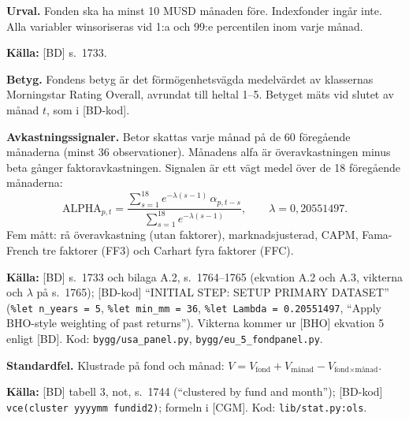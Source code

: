 \documentclass[10pt,a4paper]{article}
\newcommand{\kalla}[1]{\par\noindent\textbf{Källa:} #1\par}
\newcommand{\kod}[1]{\texttt{#1}}
\begin{document}
\textbf{Urval.} Fonden ska ha minst 10 MUSD månaden före. Indexfonder ingår inte. Alla variabler winsoriseras vid 1:a och 99:e percentilen inom varje månad.
\kalla{[BD] s.~1733.}

\textbf{Betyg.} Fondens betyg är det förmögenhetsvägda medelvärdet av klassernas Morningstar Rating Overall, avrundat till heltal 1--5. Betyget mäts vid slutet av månad $t$, som i [BD-kod].

\textbf{Avkastningssignaler.} Betor skattas varje månad på de 60 föregående månaderna (minst 36 observationer). Månadens alfa är överavkastningen minus beta gånger faktoravkastningen. Signalen är ett vägt medel över de 18 föregående månaderna:
\begin{equation}
\text{ALPHA}_{p,t}=\frac{\sum_{s=1}^{18}e^{-\lambda(s-1)}\,\alpha_{p,t-s}}{\sum_{s=1}^{18}e^{-\lambda(s-1)}},\qquad \lambda=0{,}20551497 .
\end{equation}
Fem mått: rå överavkastning (utan faktorer), marknadsjusterad, CAPM, Fama-French tre faktorer (FF3) och Carhart fyra faktorer (FFC).
\kalla{[BD] s.~1733 och bilaga A.2, s.~1764--1765 (ekvation A.2 och A.3, vikterna och $\lambda$ på s.~1765); [BD-kod] ``INITIAL STEP: SETUP PRIMARY DATASET'' (\kod{\%let n\_years = 5}, \kod{\%let min\_mm = 36}, \kod{\%let Lambda = 0.20551497}, ``Apply BHO-style weighting of past returns''). Vikterna kommer ur [BHO] ekvation 5 enligt [BD]. Kod: \kod{bygg/usa\_panel.py}, \kod{bygg/eu\_5\_fondpanel.py}.}

\textbf{Standardfel.} Klustrade på fond och månad: $V=V_{\text{fond}}+V_{\text{månad}}-V_{\text{fond}\times\text{månad}}$.
\kalla{[BD] tabell 3, not, s.~1744 (``clustered by fund and month''); [BD-kod] \kod{vce(cluster yyyymm fundid2)}; formeln i [CGM]. Kod: \kod{lib/stat.py:ols}.}
\end{document}
